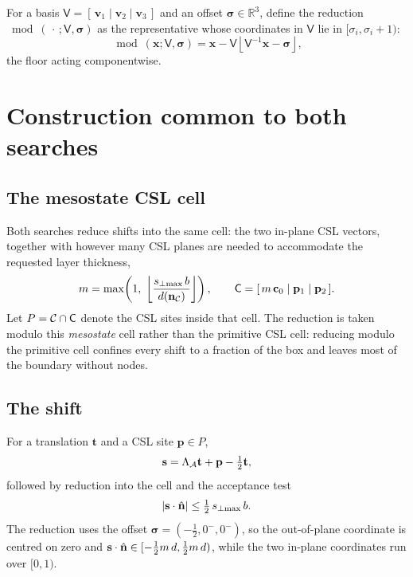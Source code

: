 For a basis $\mathsf{V} = [\,\mathbf{v}_1 \mid \mathbf{v}_2 \mid \mathbf{v}_3\,]$
and an offset $\boldsymbol{\sigma} \in \mathbb{R}^{3}$, define the reduction
$\bmod(\,\cdot\,;\mathsf{V},\boldsymbol{\sigma})$ as the representative whose
coordinates in $\mathsf{V}$ lie in $[\sigma_i, \sigma_i + 1)$:
\begin{equation}
  \bmod(\mathbf{x};\mathsf{V},\boldsymbol{\sigma})
  = \mathbf{x} - \mathsf{V}
    \left\lfloor \mathsf{V}^{-1}\mathbf{x} - \boldsymbol{\sigma} \right\rfloor ,
  \label{eq:modulo}
\end{equation}
the floor acting componentwise.

\section*{Construction common to both searches}

\subsection*{The mesostate CSL cell}

Both searches reduce shifts into the same cell: the two in-plane CSL vectors,
together with however many CSL planes are needed to accommodate the requested
layer thickness,
\begin{equation}
  m = \max\!\left(1,\;
      \left\lfloor \frac{s_{\perp\max}\, b}{d(\mathbf{n}_{\mathcal{C}})} \right\rfloor \right),
  \qquad
  \mathsf{C} = [\, m\,\mathbf{c}_0 \mid \mathbf{p}_1 \mid \mathbf{p}_2 \,].
  \label{eq:cell}
\end{equation}
Let $P = \mathcal{C} \cap \mathsf{C}$ denote the CSL sites inside that cell. The
reduction is taken modulo this \emph{mesostate} cell rather than the primitive
CSL cell: reducing modulo the primitive cell confines every shift to a fraction
of the box and leaves most of the boundary without nodes.

\subsection*{The shift}

For a translation $\mathbf{t}$ and a CSL site $\mathbf{p} \in P$,
\begin{equation}
  \mathbf{s} = \Lambda_{\mathcal{A}} \mathbf{t} + \mathbf{p} - \tfrac{1}{2}\mathbf{t},
  \label{eq:shift}
\end{equation}
followed by reduction into the cell and the acceptance test
\begin{equation}
  \left\lvert \mathbf{s} \cdot \hat{\mathbf{n}} \right\rvert \le \tfrac{1}{2}\,s_{\perp\max}\, b .
  \label{eq:accept}
\end{equation}
The reduction uses the offset $\boldsymbol{\sigma} = (-\tfrac12, 0^{-}, 0^{-})$,
so the out-of-plane coordinate is centred on zero and
$\mathbf{s}\cdot\hat{\mathbf{n}} \in [-\tfrac12 m\,d, \tfrac12 m\,d)$, while the two
in-plane coordinates run over $[0,1)$.

